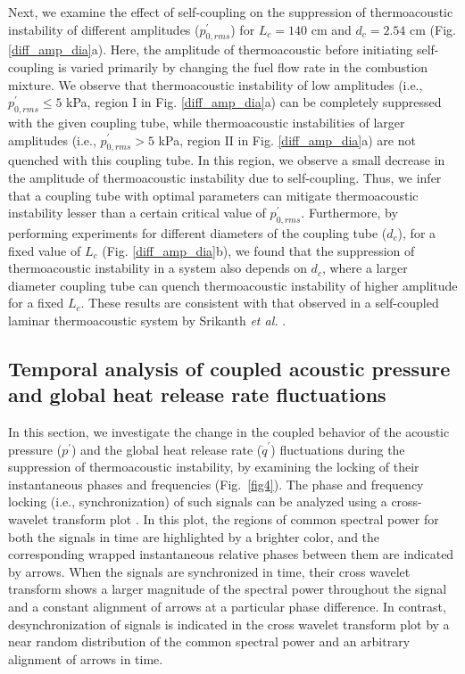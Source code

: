 \documentclass[%
preprint,
 amsmath,amssymb,
 aps,
 pra,
]{revtex4-2}
\begin{document}
Next, we examine the effect of self-coupling on the suppression of  thermoacoustic instability of different amplitudes ($p^\prime_{0,rms}$) for $L_c=140$ cm and $d_c=2.54$ cm (Fig. \ref{diff_amp_dia}a). Here, the amplitude of thermoacoustic before initiating self-coupling is varied primarily by changing the fuel flow rate in the combustion mixture. We observe that thermoacoustic instability of low amplitudes (i.e., $p^\prime_{0,rms} \leq 5$ kPa, region $\text{I}$ in Fig. \ref{diff_amp_dia}a) can be completely suppressed with the given coupling tube, while thermoacoustic instabilities of larger amplitudes (i.e., $p^\prime_{0,rms} > 5$ kPa, region $\text{II}$ in Fig. \ref{diff_amp_dia}a) are not quenched with this coupling tube. In this region, we observe a small decrease in the amplitude of thermoacoustic instability due to self-coupling. Thus, we infer that a coupling tube with optimal parameters can mitigate thermoacoustic instability lesser than a certain critical value of $p^\prime_{0,rms}$. Furthermore, by performing experiments for different diameters of the coupling tube ($d_c$), for a fixed value of $L_c$ (Fig. \ref{diff_amp_dia}b), we found that the suppression of thermoacoustic instability in a system also depends on $d_c$, where a larger diameter coupling tube can quench thermoacoustic instability of higher amplitude for a fixed $L_c$. These results are consistent with that observed in a self-coupled laminar thermoacoustic system by Srikanth \textit{et al.} \cite{srikanth2021selfcoupling}.

\subsection{Temporal analysis of coupled acoustic pressure and global heat release rate fluctuations}

In this section, we investigate the change in the coupled behavior of the acoustic pressure ($p^{\prime}$) and the global heat release rate ($\dot{q}^{\prime}$) fluctuations during the suppression of thermoacoustic instability, by examining the locking of their instantaneous phases and frequencies (Fig.~\ref{fig4}). The phase and frequency locking (i.e., synchronization) of such signals can be analyzed using a cross-wavelet transform plot \cite{grinsted2004application}. In this plot, the regions of common spectral power for both the signals in time are highlighted by a brighter color, and the corresponding wrapped instantaneous relative phases between them are indicated by arrows. When the signals are synchronized in time, their cross wavelet transform shows a larger magnitude of the spectral power throughout the signal and a constant alignment of arrows at a particular phase difference. In contrast, desynchronization of signals is indicated in the cross wavelet transform plot by a near random distribution of the common spectral power and an arbitrary alignment of arrows in time.
\end{document}
